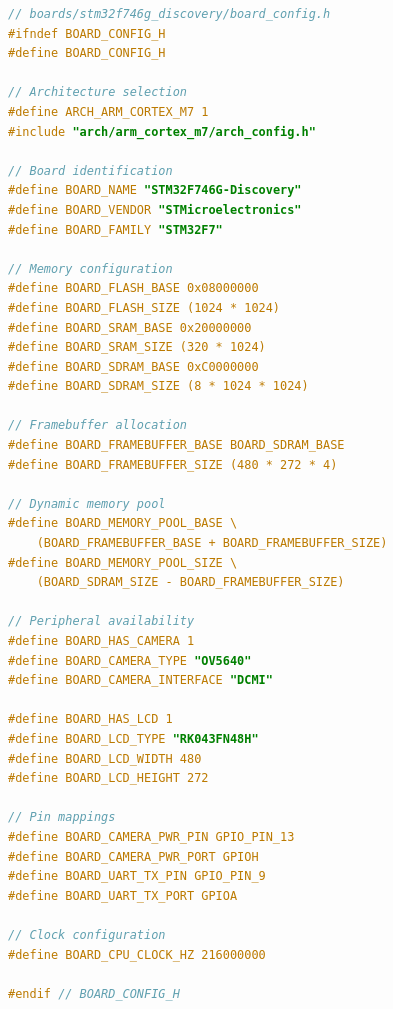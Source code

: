 \documentclass[11pt,a4paper]{article}
\begin{document}
\begin{lstlisting}[language=C,caption={Complete board\_config.h example}]
// boards/stm32f746g_discovery/board_config.h
#ifndef BOARD_CONFIG_H
#define BOARD_CONFIG_H

// Architecture selection
#define ARCH_ARM_CORTEX_M7 1
#include "arch/arm_cortex_m7/arch_config.h"

// Board identification
#define BOARD_NAME "STM32F746G-Discovery"
#define BOARD_VENDOR "STMicroelectronics"
#define BOARD_FAMILY "STM32F7"

// Memory configuration
#define BOARD_FLASH_BASE 0x08000000
#define BOARD_FLASH_SIZE (1024 * 1024)
#define BOARD_SRAM_BASE 0x20000000
#define BOARD_SRAM_SIZE (320 * 1024)
#define BOARD_SDRAM_BASE 0xC0000000
#define BOARD_SDRAM_SIZE (8 * 1024 * 1024)

// Framebuffer allocation
#define BOARD_FRAMEBUFFER_BASE BOARD_SDRAM_BASE
#define BOARD_FRAMEBUFFER_SIZE (480 * 272 * 4)

// Dynamic memory pool
#define BOARD_MEMORY_POOL_BASE \
    (BOARD_FRAMEBUFFER_BASE + BOARD_FRAMEBUFFER_SIZE)
#define BOARD_MEMORY_POOL_SIZE \
    (BOARD_SDRAM_SIZE - BOARD_FRAMEBUFFER_SIZE)

// Peripheral availability
#define BOARD_HAS_CAMERA 1
#define BOARD_CAMERA_TYPE "OV5640"
#define BOARD_CAMERA_INTERFACE "DCMI"

#define BOARD_HAS_LCD 1
#define BOARD_LCD_TYPE "RK043FN48H"
#define BOARD_LCD_WIDTH 480
#define BOARD_LCD_HEIGHT 272

// Pin mappings
#define BOARD_CAMERA_PWR_PIN GPIO_PIN_13
#define BOARD_CAMERA_PWR_PORT GPIOH
#define BOARD_UART_TX_PIN GPIO_PIN_9
#define BOARD_UART_TX_PORT GPIOA

// Clock configuration
#define BOARD_CPU_CLOCK_HZ 216000000

#endif // BOARD_CONFIG_H
\end{lstlisting}
\end{document}
